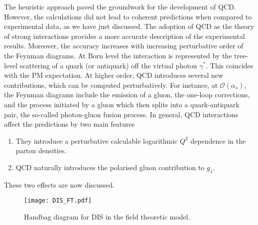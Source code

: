The heuristic approach paved the groundwork for the development of QCD. However, the calculations did not lead to coherent predictions when compared to experimental data, as we have just discussed. The adoption of QCD as the theory of strong interactions provides a more accurate description of the experimental results. Moreover, the accuracy increases with increasing perturbative order of the Feynman diagrams. At Born level the interaction is represented by the tree-level scattering of a quark (or antiquark) off the virtual photon $\gamma^{*}$. This coincides with the PM expectation. At higher order, QCD introduces several new contributions, which can be computed perturbatively. For instance, at $\mathcal{O}(\alpha_{s})$, the Feynman diagrams include the emission of a gluon, the one-loop corrections, and the process initiated by a gluon which then splits into a quark-antiquark pair, the so-called photon-gluon fusion process. In general, QCD interactions affect the predictions by two main features
\begin{enumerate}
  \item They introduce a perturbative calculable logarithmic $Q^2$ dependence in the parton densities.
  \item QCD naturally introduces the polarised gluon contribution to $g_1$.  
\end{enumerate}
These two effects are now discussed.

\begin{figure}[t]
  \centering
  \texttt{[image: DIS\_FT.pdf]} 
  \caption{Handbag diagram for DIS in the field theoretic model.}
  \label{fig:DIS_FT}
\end{figure}

